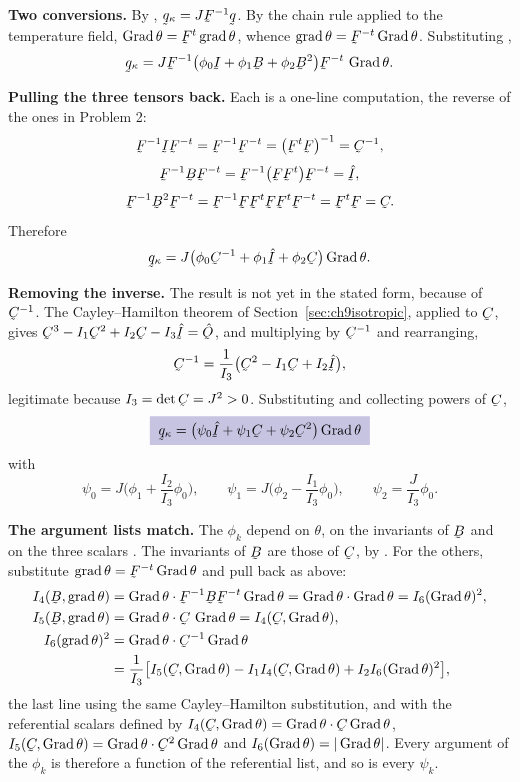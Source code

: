 \begin{solution}
\textbf{Two conversions.} By , $\bq_{\kappa}=J\bF^{-1}\bq$.
By the chain rule applied to the temperature field,
$\Grad\theta=\bF^{t}\grad\theta$, whence
$\grad\theta=\bF^{-t}\Grad\theta$. Substituting ,
\[
   \bq_{\kappa}=J\bF^{-1}
   \big(\phi_{0}\I+\phi_{1}\bB+\phi_{2}\bB^{2}\big)
   \bF^{-t}\,\Grad\theta .
\]

\textbf{Pulling the three tensors back.} Each is a one-line
computation, the reverse of the ones in Problem 2:
\[
   \bF^{-1}\I\bF^{-t}=\bF^{-1}\bF^{-t}=\big(\bF^{t}\bF\big)^{-1}
   =\bC^{-1},
\]
\[
   \bF^{-1}\bB\bF^{-t}=\bF^{-1}\big(\bF\bF^{t}\big)\bF^{-t}=\hI,
\]
\[
   \bF^{-1}\bB^{2}\bF^{-t}
   =\bF^{-1}\bF\bF^{t}\bF\bF^{t}\bF^{-t}=\bF^{t}\bF=\bC .
\]
Therefore
\[
   \bq_{\kappa}=J\big(\phi_{0}\bC^{-1}+\phi_{1}\hI
   +\phi_{2}\bC\big)\Grad\theta .
\]

\textbf{Removing the inverse.} The result is not yet in the stated form,
because of $\bC^{-1}$. The Cayley--Hamilton theorem of
Section~\ref{sec:ch9isotropic}, applied to $\bC$, gives
$\bC^{3}-I_{1}\bC^{2}+I_{2}\bC-I_{3}\hI=\hOb$, and multiplying by
$\bC^{-1}$ and rearranging,
\[
   \bC^{-1}=\frac{1}{I_{3}}\big(\bC^{2}-I_{1}\bC+I_{2}\hI\big),
\]
legitimate because $I_{3}=\det\bC=J^{2}>0$. Substituting and collecting
powers of $\bC$,
\[
   \boxed{\;\bq_{\kappa}=\big(\psi_{0}\hI+\psi_{1}\bC
   +\psi_{2}\bC^{2}\big)\Grad\theta\;}
\]
with
\[
   \psi_{0}=J\Big(\phi_{1}+\frac{I_{2}}{I_{3}}\phi_{0}\Big),
   \qquad
   \psi_{1}=J\Big(\phi_{2}-\frac{I_{1}}{I_{3}}\phi_{0}\Big),
   \qquad
   \psi_{2}=\frac{J}{I_{3}}\phi_{0} .
\]

\textbf{The argument lists match.} The $\phi_{k}$ depend on $\theta$, on the invariants of $\bB$ and on
the three scalars . The invariants of $\bB$ are those of
$\bC$, by . For the others, substitute
$\grad\theta=\bF^{-t}\Grad\theta$ and pull back as above:
\[
\begin{aligned}
   I_{4}(\bB,\grad\theta)
   &=\ip{\Grad\theta}{\bF^{-1}\bB\bF^{-t}\Grad\theta}
   =\ip{\Grad\theta}{\Grad\theta}=I_{6}(\Grad\theta)^{2},\\
   I_{5}(\bB,\grad\theta)
   &=\ip{\Grad\theta}{\bC\,\Grad\theta}=I_{4}(\bC,\Grad\theta),\\
   I_{6}(\grad\theta)^{2}
   &=\ip{\Grad\theta}{\bC^{-1}\Grad\theta}\\
   &=\frac{1}{I_{3}}\big[I_{5}(\bC,\Grad\theta)
   -I_{1}I_{4}(\bC,\Grad\theta)+I_{2}I_{6}(\Grad\theta)^{2}\big],
\end{aligned}
\]
the last line using the same Cayley--Hamilton substitution, and with the
referential scalars defined by
$I_{4}(\bC,\Grad\theta)=\ip{\Grad\theta}{\bC\Grad\theta}$,
$I_{5}(\bC,\Grad\theta)=\ip{\Grad\theta}{\bC^{2}\Grad\theta}$ and
$I_{6}(\operatorname{Grad}\theta)=|\operatorname{Grad}\theta|$. Every argument of the $\phi_{k}$ is
therefore a function of the referential list, and so is every
$\psi_{k}$.


\end{solution}
